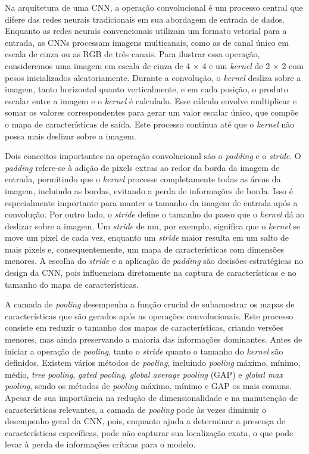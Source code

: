Na arquitetura de uma CNN, a operação convolucional é um processo central que difere das redes neurais tradicionais em sua abordagem de entrada de dados. Enquanto as redes neurais convencionais utilizam um formato vetorial para a entrada, as CNNs processam imagens multicanais, como as de canal único em escala de cinza ou as RGB de três canais. Para ilustrar essa operação, consideremos uma imagem em escala de cinza de 4 × 4 e um \textit{kernel} de 2 × 2 com pesos inicializados aleatoriamente. Durante a convolução, o \textit{kernel} desliza sobre a imagem, tanto horizontal quanto verticalmente, e em cada posição, o produto escalar entre a imagem e o \textit{kernel} é calculado. Esse cálculo envolve multiplicar e somar os valores correspondentes para gerar um valor escalar único, que compõe o mapa de características de saída. Este processo continua até que o \textit{kernel} não possa mais deslizar sobre a imagem.

Dois conceitos importantes na operação convolucional são o \textit{padding} e o \textit{stride}. O \textit{padding} refere-se à adição de pixels extras ao redor da borda da imagem de entrada, permitindo que o \textit{kernel} processe completamente todas as áreas da imagem, incluindo as bordas, evitando a perda de informações de borda. Isso é especialmente importante para manter o tamanho da imagem de entrada após a convolução. Por outro lado, o \textit{stride} define o tamanho do passo que o \textit{kernel} dá ao deslizar sobre a imagem. Um \textit{stride} de um, por exemplo, significa que o \textit{kernel} se move um pixel de cada vez, enquanto um \textit{stride} maior resulta em um salto de mais pixels e, consequentemente, um mapa de características com dimensões menores. A escolha do \textit{stride} e a aplicação de \textit{padding} são decisões estratégicas no design da CNN, pois influenciam diretamente na captura de características e no tamanho do mapa de características.

A camada de \textit{pooling} desempenha a função crucial de subamostrar os mapas de características que são gerados após as operações convolucionais. Este processo consiste em reduzir o tamanho dos mapas de características, criando versões menores, mas ainda preservando a maioria das informações dominantes. Antes de iniciar a operação de \textit{pooling}, tanto o \textit{stride} quanto o tamanho do \textit{kernel} são definidos. Existem vários métodos de \textit{pooling}, incluindo \textit{pooling} máximo, mínimo, médio, \textit{tree pooling}, \textit{gated pooling}, \textit{global average pooling} (GAP) e \textit{global max pooling}, sendo os métodos de \textit{pooling} máximo, mínimo e GAP os mais comuns. Apesar de sua importância na redução de dimensionalidade e na manutenção de características relevantes, a camada de \textit{pooling} pode às vezes diminuir o desempenho geral da CNN, pois, enquanto ajuda a determinar a presença de características específicas, pode não capturar sua localização exata, o que pode levar à perda de informações críticas para o modelo.

